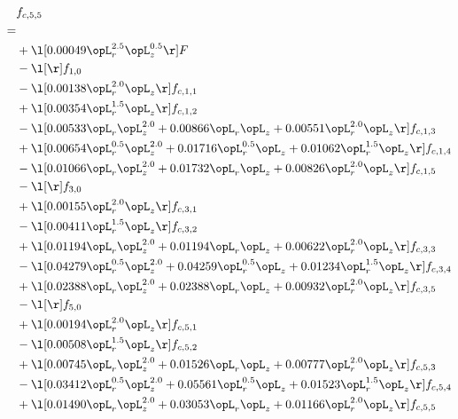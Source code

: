 \begin{alignat}{2} 
\label{eq:f_55_1} 
& f_{c,5,5} \nonumber \\ 
 = \\ 
& + \l[  0.00049 \opL_r^{2.5} \opL_z^{0.5}  \r] F \nonumber \\ 
& - \l[  \r] f_{1,0} \nonumber \\ 
& - \l[  0.00138 \opL_r^{2.0} \opL_z  \r] f_{c,1,1} \nonumber \\ 
& + \l[  0.00354 \opL_r^{1.5} \opL_z  \r] f_{c,1,2} \nonumber \\ 
& - \l[  0.00533 \opL_r \opL_z^{2.0} +  0.00866 \opL_r \opL_z +  0.00551 \opL_r^{2.0} \opL_z  \r] f_{c,1,3} \nonumber \\ 
& + \l[  0.00654 \opL_r^{0.5} \opL_z^{2.0} +  0.01716 \opL_r^{0.5} \opL_z +  0.01062 \opL_r^{1.5} \opL_z  \r] f_{c,1,4} \nonumber \\ 
& - \l[  0.01066 \opL_r \opL_z^{2.0} +  0.01732 \opL_r \opL_z +  0.00826 \opL_r^{2.0} \opL_z  \r] f_{c,1,5} \nonumber \\ 
& - \l[  \r] f_{3,0} \nonumber \\ 
& + \l[  0.00155 \opL_r^{2.0} \opL_z  \r] f_{c,3,1} \nonumber \\ 
& - \l[  0.00411 \opL_r^{1.5} \opL_z  \r] f_{c,3,2} \nonumber \\ 
& + \l[  0.01194 \opL_r \opL_z^{2.0} +  0.01194 \opL_r \opL_z +  0.00622 \opL_r^{2.0} \opL_z  \r] f_{c,3,3} \nonumber \\ 
& - \l[  0.04279 \opL_r^{0.5} \opL_z^{2.0} +  0.04259 \opL_r^{0.5} \opL_z +  0.01234 \opL_r^{1.5} \opL_z  \r] f_{c,3,4} \nonumber \\ 
& + \l[  0.02388 \opL_r \opL_z^{2.0} +  0.02388 \opL_r \opL_z +  0.00932 \opL_r^{2.0} \opL_z  \r] f_{c,3,5} \nonumber \\ 
& - \l[  \r] f_{5,0} \nonumber \\ 
& + \l[  0.00194 \opL_r^{2.0} \opL_z  \r] f_{c,5,1} \nonumber \\ 
& - \l[  0.00508 \opL_r^{1.5} \opL_z  \r] f_{c,5,2} \nonumber \\ 
& + \l[  0.00745 \opL_r \opL_z^{2.0} +  0.01526 \opL_r \opL_z +  0.00777 \opL_r^{2.0} \opL_z  \r] f_{c,5,3} \nonumber \\ 
& - \l[  0.03412 \opL_r^{0.5} \opL_z^{2.0} +  0.05561 \opL_r^{0.5} \opL_z +  0.01523 \opL_r^{1.5} \opL_z  \r] f_{c,5,4} \nonumber \\ 
& + \l[  0.01490 \opL_r \opL_z^{2.0} +  0.03053 \opL_r \opL_z +  0.01166 \opL_r^{2.0} \opL_z  \r] f_{c,5,5} \nonumber \\ 

\end{alignat}
